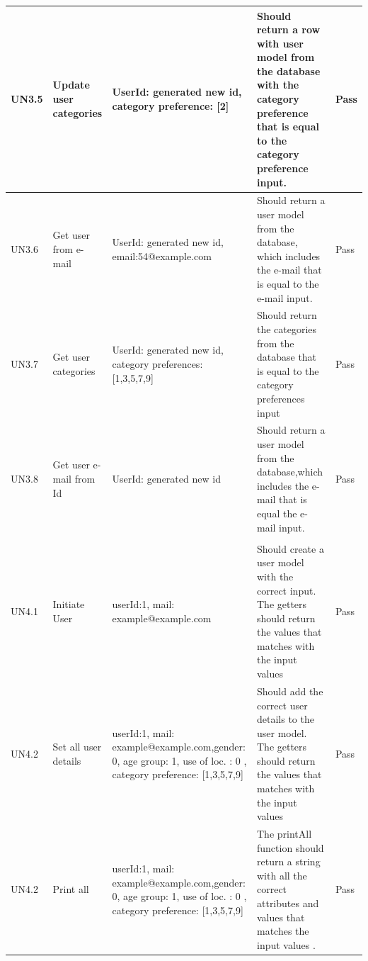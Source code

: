 \begin{appendices}
\begin{center}
\begin{longtable}{ | p{1.4cm} | p{5.5cm} | p{4cm} | p{4.5cm} | p{1.8cm}|}
		UN3.5 & Update user categories & UserId: generated new id, \newline category preference: [2] & Should return a row with user model from the database with the category preference that is equal to the category preference input.  & Pass\\ \hline
		
		UN3.6 & Get user from e-mail & UserId: generated new id, \newline email:54@example.com & Should return a user model from the database, which includes the e-mail that is equal to the e-mail input.   & Pass\\ \hline							
		
		UN3.7 & Get user categories & UserId: generated new id, \newline category preferences: [1,3,5,7,9] & Should return the categories from the database that is equal to the category preferences input  & Pass\\ \hline
		
		UN3.8 & Get user e-mail from Id  & UserId: generated new id  &  Should return a  user model from the database,which includes the e-mail that is equal the e-mail input. & Pass\\ \hline
		\pagebreak
		\hline
		\multicolumn{5}{| >{\columncolor[gray]{0.8}} c |}{Unit 4: User Model}	\\\hline
		
		UN4.1 & Initiate User   & userId:1, \newline mail: example@example.com & Should create a user model with the correct input. The getters should return the values that matches with the input values& Pass\\ \hline
		
		UN4.2 & Set all user details &userId:1, \newline mail: example@example.com,gender: 0, age group: 1, use of loc. : 0 , category preference: [1,3,5,7,9] & Should add the correct user details to the user model. The getters should return the values that matches with the input values  & Pass\\ \hline
		
		UN4.2 & Print all  &  userId:1, \newline mail: example@example.com,gender: 0, age group: 1, use of loc. : 0 , category preference: [1,3,5,7,9] & The printAll function should return a string with all the correct attributes and values that matches the input values .   & Pass\\ \hline
		

\end{longtable}
\end{center}
\end{appendices}
